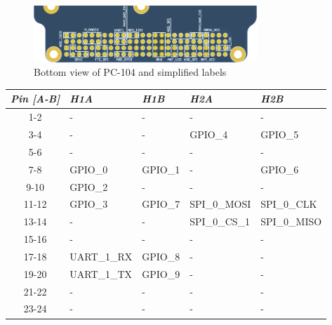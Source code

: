 \begin{figure}[!ht]
    \begin{center}
        \includegraphics[width=0.75\textwidth]{figures/pc-104-scheme.png}
        \caption{Bottom view of PC-104 and simplified labels}
        \label{fig:pc-104-scheme}
    \end{center}
\end{figure}

\begin{table}[!h]
    \centering
    \begin{tabular}{cllll}
        \toprule[1.5pt]
        \textit{Pin [A-B]} & \textit{H1A}     & \textit{H1B}     & \textit{H2A}  & \textit{H2B}  \\
        \midrule
        1-2                & -                & -                & -             & -             \\
        3-4                & -                & -                & GPIO\_4       & GPIO\_5       \\
        5-6                & -                & -                & -             & -             \\
        7-8                & GPIO\_0          & GPIO\_1          & -             & GPIO\_6       \\
        9-10               & GPIO\_2          & -                & -             & -             \\
        11-12              & GPIO\_3          & GPIO\_7          & SPI\_0\_MOSI  & SPI\_0\_CLK   \\
        13-14              & -                & -                & SPI\_0\_CS\_1 & SPI\_0\_MISO  \\
        15-16              & -                & -                & -             & -             \\
        17-18              & UART\_1\_RX      & GPIO\_8          & -             & -             \\
        19-20              & UART\_1\_TX      & GPIO\_9          & -             & -             \\
        21-22              & -                & -                & -             & -             \\
        23-24              & -                & -                & -             & -             \\

\end{tabular}
\end{table}
